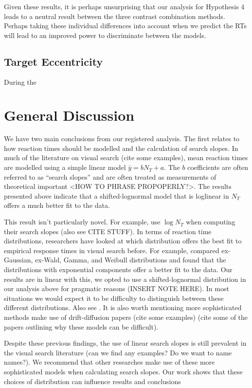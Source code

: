 \documentclass[preprint,12pt,authoryear]{elsarticle}
\begin{document}
Given these results, it is perhaps unsurprising that our analysis for Hypothesis 4 leads to a neutral result between the three contrast combination methods. Perhaps taking these individual differences into account when we predict the RTs will lead to an improved power to discriminate between the models. 

\subsection{Target Eccentricity}

During the 

\section{General Discussion}

We have two main conclusions from our registered analysis. The first relates to how reaction times should be modelled and the calculation of search slopes. In much of the literature on visual search (cite some examples), mean reaction times are modelled using a simple linear model $\bar{y} = b N_T + a$. The $b$ coefficients are often referred to as ``search slopes'' and are often treated as measurements of theoretical important <HOW TO PHRASE PROPOPERLY?>. The results presented above indicate that a shifted-lognormal model that is loglinear in $N_T$ offers a much better fit to the data.

This result isn't particularly novel. For example, \cite{buetti2019predicting} use $\log{N_T}$ when computing their search slopes (also see CITE STUFF). In terms of reaction time distributions, researchers have looked at which distribution offers the best fit to empirical response times in visual search before. For example, \cite{palmer2011shapes} compared ex-Gaussian, ex-Wald, Gamma, and Weibull distributions and found that the distributions with exponential components offer a better fit to the data. Our results are in linear with this, we opted to use a shifted-lognormal distribution in our analysis above for pragmatic reasons (INSERT NOTE HERE). In most situations we would expect it to be difficulty to distinguish between these different distributions. Also see \citep{wolfe2010reaction}. It is also worth mentioning more sophisticated methods make use of drift-diffusion papers (cite some examples) (cite some of the papers outlining why these models can be difficult).  

Despite these previous findings, the use of linear search slopes is still prevalent in the visual search literature (can we find any examples? Do we want to name names?). We recommend that other researches make use of these more sophisticated models when calculating search slopes. Our work shows that these choices of distribution can influence results and conclusions 
\end{document}
